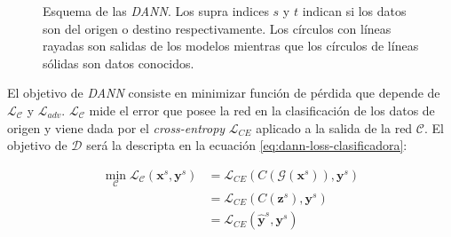 \begin{figure}[H]

    \caption{Esquema de las {\it DANN}. Los supra indices $s$ y $t$ indican si los datos son del origen o destino respectivamente.
        Los círculos con líneas rayadas son salidas de los modelos mientras que los círculos de líneas sólidas son datos conocidos.}
    \label{fig:dann-esquema}
\end{figure}

El objetivo de {\it DANN} consiste en minimizar función de pérdida que depende de $\mathcal{L}_\mathcal{C}$ y
$\mathcal{L}_{adv}$. $\mathcal{L}_\mathcal{C}$ mide el error que posee la red en la clasificación de los datos de
origen y viene dada por el {\it cross-entropy} $\mathcal{L}_{CE}$ aplicado a la salida de la red $\mathcal{C}$. El
objetivo de $\mathcal{D}$ será la descripta en la ecuación \ref{eq:dann-loss-clasificadora}:

\begin{align}
    \min_{\mathcal{C}} \mathcal{L}_\mathcal{C}(\mathbf{x}^s, \mathbf{y}^s) & = \mathcal{L}_{CE}(C(\mathcal{G}(\mathbf{x}^s)), \mathbf{y}^s) \nonumber \\
                                                                           & = \mathcal{L}_{CE}(C(\mathbf{z}^s), \mathbf{y}^s) \nonumber              \\
                                                                           & = \mathcal{L}_{CE}(\hat{\mathbf{y}}^s, \mathbf{y}^s)
    \label{eq:dann-loss-clasificadora}
\end{align}

